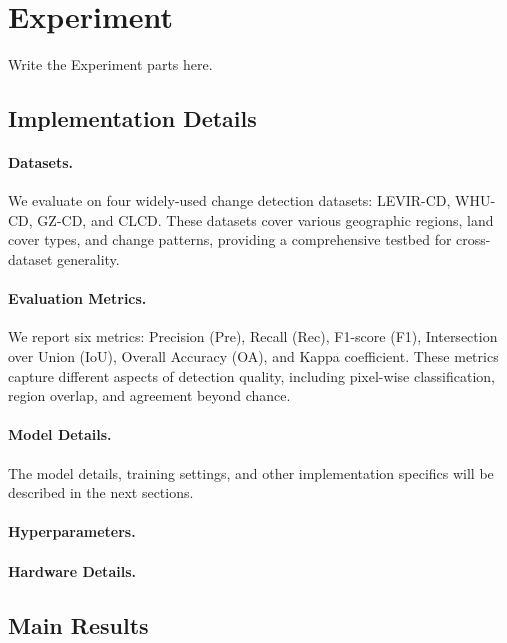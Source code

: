 \section{Experiment}\label{sec:Experiment}
    Write the Experiment parts here.%
    \subsection{Implementation Details}\label{subsec:Implementation Details}%
        \paragraph{Datasets.} We evaluate on four widely-used change detection datasets: LEVIR-CD, WHU-CD, GZ-CD, and CLCD. These datasets cover various geographic regions, land cover types, and change patterns, providing a comprehensive testbed for cross-dataset generality.%

        \paragraph{Evaluation Metrics.} We report six metrics: Precision (Pre), Recall (Rec), F1-score (F1), Intersection over Union (IoU), Overall Accuracy (OA), and Kappa coefficient. These metrics capture different aspects of detection quality, including pixel-wise classification, region overlap, and agreement beyond chance.%

        \paragraph{Model Details.} The model details, training settings, and other implementation specifics will be described in the next sections.%

        \paragraph{Hyperparameters.} %

        \paragraph{Hardware Details.} %
    

    \subsection{Main Results}\label{subsec:Main Results}%


